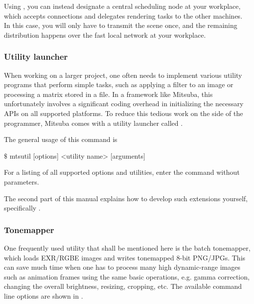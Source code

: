 Using , you can
instead designate a central scheduling node at your workplace, which accepts connections and delegates
rendering tasks to the other machines. In this case, you will only have to transmit the scene once,
and the remaining distribution happens over the fast local network at your workplace.
\subsubsection{Utility launcher}
\label{sec:mtsutil}
When working on a larger project, one often needs to implement various utility programs that
perform simple tasks, such as applying a filter to an image or processing
a matrix stored in a file. In a framework like Mitsuba, this unfortunately involves
a significant coding overhead in initializing the necessary APIs on all supported platforms.
To reduce this tedious work on the side of the programmer, Mitsuba comes with a utility launcher
called .

The general usage of this command is
\begin{shell}
$\texttt{\$}$ mtsutil [options] <utility name> [arguments]
\end{shell}
For a listing of all supported options and utilities, enter the command without parameters.

The second part of this manual explains how to develop such extensions yourself, specifically
.

\subsubsection{Tonemapper}
\label{sec:tonemapper}
One frequently used utility that shall be mentioned here is the batch tonemapper, which
loads EXR/RGBE images and writes tonemapped 8-bit PNG/JPGs. This can save much time when one has to
process many high dynamic-range images such as animation frames using the same basic operations,
e.g. gamma correction, changing the overall brightness, resizing, cropping, etc. The available
command line options are shown in .

